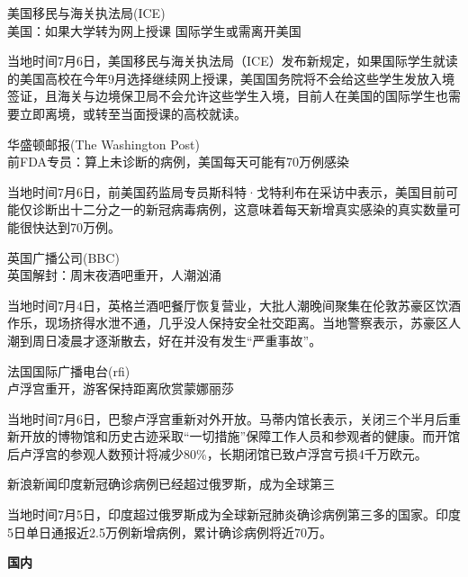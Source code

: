 \documentclass[
]{article}
\begin{document}
\begin{center}
\textcolor{glaucous}{美国移民与海关执法局(ICE)}\\美国：如果大学转为网上授课 国际学生或需离开美国
\end{center}

当地时间7月6日，美国移民与海关执法局（ICE）发布新规定，如果国际学生就读的美国高校在今年9月选择继续网上授课，美国国务院将不会给这些学生发放入境签证，且海关与边境保卫局不会允许这些学生入境，目前人在美国的国际学生也需要立即离境，或转至当面授课的高校就读。

\begin{center}
\textcolor{glaucous}{华盛顿邮报(The Washington Post)}\\前FDA专员：算上未诊断的病例，美国每天可能有70万例感染
\end{center}

当地时间7月6日，前美国药监局专员斯科特·戈特利布在采访中表示，美国目前可能仅诊断出十二分之一的新冠病毒病例，这意味着每天新增真实感染的真实数量可能很快达到70万例。

\begin{center}
\textcolor{glaucous}{英国广播公司(BBC)}\\英国解封：周末夜酒吧重开，人潮汹涌
\end{center}

当地时间7月4日，英格兰酒吧餐厅恢复营业，大批人潮晚间聚集在伦敦苏豪区饮酒作乐，现场挤得水泄不通，几乎没人保持安全社交距离。当地警察表示，苏豪区人潮到周日凌晨才逐渐散去，好在并没有发生``严重事故''。

\begin{center}
\textcolor{glaucous}{法国国际广播电台(rfi)}\\卢浮宫重开，游客保持距离欣赏蒙娜丽莎
\end{center}

当地时间7月6日，巴黎卢浮宫重新对外开放。马蒂内馆长表示，关闭三个半月后重新开放的博物馆和历史古迹采取``一切措施''保障工作人员和参观者的健康。而开馆后卢浮宫的参观人数预计将减少80\%，长期闭馆已致卢浮宫亏损4千万欧元。

\begin{center}
\textcolor{glaucous}{新浪新闻}印度新冠确诊病例已经超过俄罗斯，成为全球第三
\end{center}

当地时间7月5日，印度超过俄罗斯成为全球新冠肺炎确诊病例第三多的国家。印度5日单日通报近2.5万例新增病例，累计确诊病例将近70万。

\vspace{5mm}

\begin{huge}{\textcolor{glaucous}{\textbf {国内}}}\end{huge}
\end{document}
